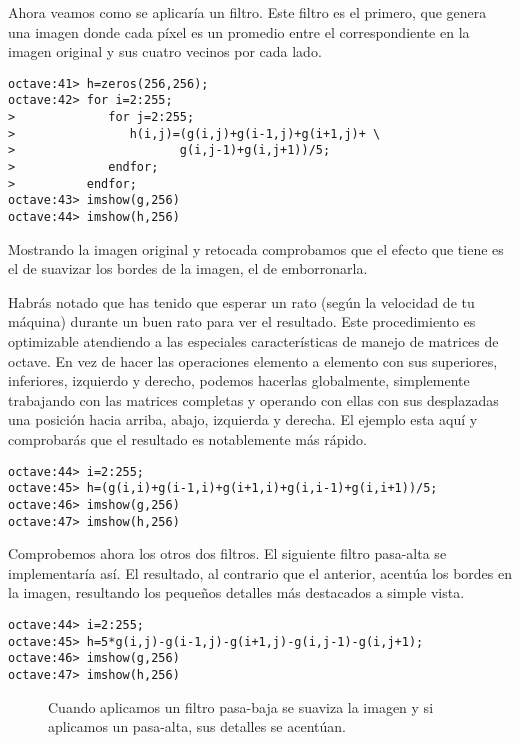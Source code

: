 Ahora veamos como  se aplicaría un filtro. Este filtro  es el primero,
que  genera una  imagen  donde  cada píxel  es  un  promedio entre  el
correspondiente en  la imagen original  y sus cuatro vecinos  por cada
lado.

\begin{verbatim}
octave:41> h=zeros(256,256);
octave:42> for i=2:255;
>             for j=2:255;
>                h(i,j)=(g(i,j)+g(i-1,j)+g(i+1,j)+ \
>                       g(i,j-1)+g(i,j+1))/5;
>             endfor;
>          endfor;
octave:43> imshow(g,256)
octave:44> imshow(h,256)
\end{verbatim}

Mostrando la imagen original y  retocada comprobamos que el efecto que
tiene es el de suavizar los bordes de la imagen, el de emborronarla.

Habrás notado que  has tenido que esperar un rato  (según la velocidad
de  tu  máquina)   durante  un  buen  rato  para   ver  el  resultado.
Este  procedimiento   es  optimizable  atendiendo  a   las  especiales
características de manejo  de matrices de octave. En vez  de hacer las
operaciones  elemento  a  elemento  con  sus  superiores,  inferiores,
izquierdo  y   derecho,  podemos  hacerlas   globalmente,  simplemente
trabajando con  las matrices  completas y operando  con ellas  con sus
desplazadas una posición hacia arriba,  abajo, izquierda y derecha. El
ejemplo esta aquí  y comprobarás que el resultado  es notablemente más
rápido.

\begin{verbatim}
octave:44> i=2:255;
octave:45> h=(g(i,i)+g(i-1,i)+g(i+1,i)+g(i,i-1)+g(i,i+1))/5;
octave:46> imshow(g,256)
octave:47> imshow(h,256)
\end{verbatim}

Comprobemos ahora los otros dos filtros. El siguiente filtro pasa-alta
se  implementaría así.  El resultado,  al contrario  que el  anterior,
acentúa los bordes en la  imagen, resultando los pequeños detalles más
destacados a simple vista.

\begin{verbatim}
octave:44> i=2:255;
octave:45> h=5*g(i,j)-g(i-1,j)-g(i+1,j)-g(i,j-1)-g(i,j+1);
octave:46> imshow(g,256)
octave:47> imshow(h,256)
\end{verbatim}

\begin{figure}[htbp]
\centering
{}
\caption[Imagen tras aplicarle un filtro pasa-baja y pasa-alta]%
{Cuando aplicamos un filtro pasa-baja se suaviza la imagen y si 
aplicamos un pasa-alta, sus detalles se acentúan.}
\end{figure}


